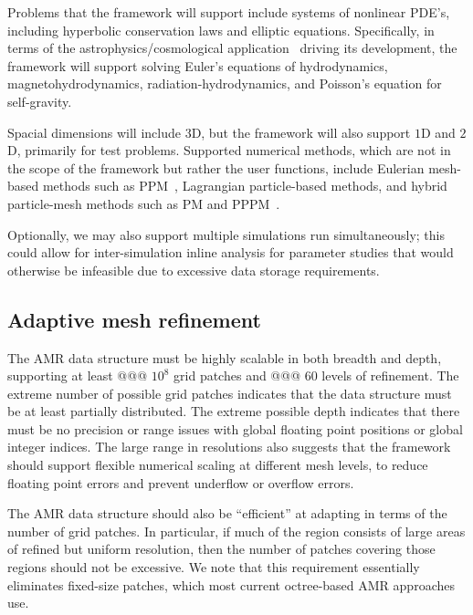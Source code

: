 \documentclass[10pt,twocolumn]{article}
\begin{document}
Problems that the framework will support include systems of nonlinear
PDE's, including hyperbolic conservation laws and elliptic equations.
Specifically, in terms of the astrophysics/cosmological application
\enzoii\ driving its development, the framework will support solving
Euler's equations of hydrodynamics, magnetohydrodynamics,
radiation-hydrodynamics, and Poisson's equation for self-gravity.

Spacial dimensions will include $3$D, but the framework will also
support $1$D and $2$D, primarily for test problems.  Supported
numerical methods, which are not in the scope of the framework but
rather the user functions, include Eulerian mesh-based methods such as
PPM~\cite{WoCo84b}, Lagrangian particle-based methods, and hybrid
particle-mesh methods such as PM and PPPM~\cite{HoEa88}.

Optionally, we may also support multiple simulations run
simultaneously; this could allow for inter-simulation inline analysis
for parameter studies that would otherwise be infeasible due to
excessive data storage requirements.


\subsection{Adaptive mesh refinement} \label{ss:require-amr}

The AMR data structure must be highly scalable in both breadth and
depth, supporting at least @@@ $10^8$ grid patches and @@@ $60$ levels
of refinement.  The extreme number of possible grid patches indicates
that the data structure must be at least partially distributed.  The
extreme possible depth indicates that there must be no precision or
range issues with global floating point positions or global integer
indices.  The large range in resolutions also suggests that the
framework should support flexible numerical scaling at different mesh
levels, to reduce floating point errors and prevent underflow or
overflow errors.

The AMR data structure should also be ``efficient'' at adapting in
terms of the number of grid patches.  In particular, if much of the
region consists of large areas of refined but uniform resolution, then
the number of patches covering those regions should not be excessive.
We note that this requirement essentially eliminates fixed-size
patches, which most current octree-based AMR approaches use.
\end{document}

